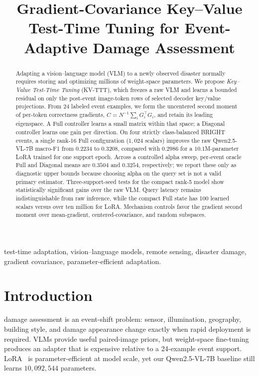 \documentclass[conference]{IEEEtran}
\newcommand{\KVTTT}{\textsc{KV-TTT}}
\begin{document}
\title{Gradient-Covariance Key--Value Test-Time Tuning for Event-Adaptive Damage Assessment}
\author{}
\maketitle

\begin{abstract}
Adapting a vision--language model (VLM) to a newly observed disaster normally
requires storing and optimizing millions of weight-space parameters. We propose
\emph{Key--Value Test-Time Tuning} (\KVTTT{}), which freezes a raw VLM and
learns a bounded residual on only the post-event image-token rows of selected
decoder key/value projections. From 24 labeled event examples, we form the
uncentered second moment of per-token correctness gradients,
$C=N^{-1}\sum_i G_i^\top G_i$, and retain its leading eigenspace. A Full
controller learns a small matrix within that space; a Diagonal controller
learns one gain per direction. On four strictly class-balanced \textsc{BRIGHT}
events, a single rank-16 Full configuration ($1{,}024$ scalars) improves the raw
Qwen2.5-VL-7B macro-F1 from $0.2234$ to $0.3208$, compared with $0.2986$ for a
$10.1$M-parameter LoRA trained for one support epoch. Across a controlled alpha
sweep, per-event oracle Full and Diagonal means are $0.3504$ and $0.3254$,
respectively; we report these only as diagnostic upper bounds because choosing
alpha on the query set is not a valid primary estimator. Three-support-seed
tests for the compact rank-5 model show statistically significant gains over
the raw VLM. Query latency remains indistinguishable from raw inference, while
the compact Full state has 100 learned scalars versus over ten million for
LoRA. Mechanism controls favor the gradient second moment over mean-gradient,
centered-covariance, and random subspaces.
\end{abstract}

\begin{IEEEkeywords}
test-time adaptation, vision--language models, remote sensing, disaster damage,
gradient covariance, parameter-efficient adaptation.
\end{IEEEkeywords}

\section{Introduction}
 damage assessment is an event-shift problem: sensor,
illumination, geography, building style, and damage appearance change exactly
when rapid deployment is required. VLMs provide useful paired-image priors, but
weight-space fine-tuning produces an adapter that is expensive relative to a
24-example event support. LoRA~\cite{hu2021lora} is parameter-efficient at model
scale, yet our Qwen2.5-VL-7B baseline still learns $10{,}092{,}544$ parameters.
\end{document}
